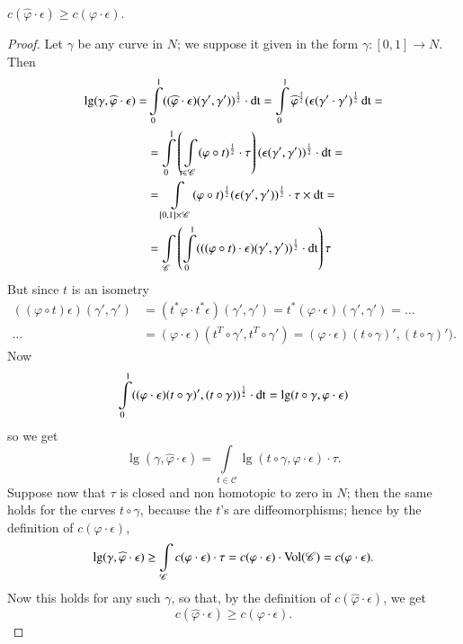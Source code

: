 \begin{lemma*}
$c(\widehat{\varphi}\cdot\epsilon)\geq c(\varphi\cdot\epsilon)$.
\end{lemma*}

\begin{proof}
Let $\gamma$ be any curve in $N$; we suppose it given in the form
$\gamma:[0,1]\to N$. Then
\begin{align*}
\lg(\gamma,\widehat{\varphi}\cdot\epsilon) = 
&\int\limits^{1}_{0}((\widehat{\varphi}\cdot\epsilon)(\gamma',\gamma'))^{\frac{1}{2}}\cdot
\operatorname{dt}=\int\limits^{1}_{0}\widehat{\varphi}^{\frac{1}{2}}(\epsilon(\gamma'\cdot\gamma')^{\frac{1}{2}}\operatorname{dt}=\\
&= \int\limits^{1}_{0}\left(\int\limits_{t\in\mathscr{C}}(\varphi\circ
t)^{\frac{1}{2}}\cdot\tau\right)(\epsilon(\gamma',\gamma'))^{\frac{1}{2}}\cdot
\operatorname{dt}=\\
&=\int\limits_{[0,1]\times\mathscr{C}}(\varphi\circ
t)^{\frac{1}{2}}(\epsilon(\gamma',\gamma'))^{\frac{1}{2}}\cdot\tau\times
\operatorname{dt}=\\
&=\int\limits_{\mathscr{C}}\left(\int\limits^{1}_{0}(((\varphi\circ
t)\cdot \epsilon)(\gamma',\gamma'))^{\frac{1}{2}}\cdot \operatorname{dt}\right)\tau
\end{align*}
But since $t$ is an isometry
\begin{align*}
((\varphi\circ t)\epsilon)(\gamma',\gamma') &= (t^{\ast}\varphi\cdot
  t^{\ast}\epsilon)(\gamma',\gamma')=t^{\ast}(\varphi\cdot
  \epsilon)(\gamma',\gamma')=\ldots\\
\ldots &= (\varphi\cdot\epsilon)(t^{T}\circ
\gamma',t^{T}\circ\gamma')=(\varphi\cdot\epsilon)(t\circ
\gamma)',(t\circ \gamma)').
\end{align*}
Now
$$
\int\limits^{1}_{0}((\varphi\cdot \epsilon)(t\circ
\gamma)',(t\circ\gamma))^{\frac{1}{2}}\cdot \operatorname{dt}=\lg(t\circ
\gamma,\varphi\cdot \epsilon)
$$
so we get
$$
\lg(\gamma,\widehat{\varphi}\cdot\epsilon)=\int\limits_{t\in\mathscr{C}}\lg(t\circ\gamma,\varphi\cdot\epsilon)\cdot \tau.
$$
Suppose \pageoriginale now that $\tau$ is closed and non homotopic to
zero in $N$; then the same holds for the curves $t\circ \gamma$,
because the $t$'s are diffeomorphisms; hence by the definition of
$c(\varphi\cdot \epsilon)$, 
$$
\lg(\gamma,\widehat{\varphi}\cdot\epsilon)\geq
\int\limits_{\mathscr{C}}c(\varphi\cdot\epsilon)\cdot\tau=c(\varphi\cdot\epsilon)\cdot\operatorname{Vol}(\mathscr{C})=c(\varphi\cdot\epsilon). 
$$
Now this holds for any such $\gamma$, so that, by the definition of
$c(\widehat{\varphi}\cdot\epsilon)$, we get
$$
c(\widehat{\varphi}\cdot\epsilon)\geq c(\varphi\cdot\epsilon).
$$
\end{proof}


